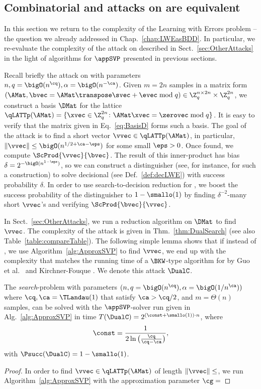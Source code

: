 \subsection{Combinatorial \DUAL and \BKW attacks on \LWE are equivalent} \label{subsec:ReEvalLWE}

In this section we return to the complexity of the Learning with Errors problem -- the question we already addressed in Chap.~\ref{chap:LWEasBDD}. In particular, we re-evaluate the complexity of the \DUAL attack on \LWE described in Sect.~\ref{sec:OtherAttacks} in the light of algorithms for $\appSVP$ presented in previous sections.

Recall briefly the \DUAL attack on \LWE with parameters $n, q = \bigO(n^{\cq}), \alpha = \bigO(n^{-\ca})$. Given $m=2n$ \LWE samples in a matrix form $(\AMat, \bvec = \AMat\transpose \svec + \evec \bmod q) \in \Z_q^{n \times 2n} \times \Z_q^{2n}$, we construct a basis $\DMat$ for the lattice $\qLATTp(\AMat)=\{ \xvec \in \Z_q^{2n} \colon \AMat \xvec = \zerovec \bmod q \}$. It is easy to verify that the matrix given in Eq.~\eqref{eq:BasisD} forms such a basis. The goal of the \DUAL attack is to find a short vector $\vvec \in \qLATTp(\AMat)$, in particular, $\|\vvec \| \leq \bigO(n^{1/2+\ca - \eps})$ for some small $\eps>0$. Once found, we compute $\ScProd{\vvec}{\bvec}$. The result of this inner-product has bias $\delta = 2^{-\bigO(n^{1-\eps})}$, so we can construct a distinguisher (see, for instance, \cite{EC:DucTraVau15} for such a construction) to solve decisional \LWE (see Def.~\ref{def:decLWE}) with success probability $\delta$. In order to use search-to-decision reduction for \LWE \cite{EC:MicPei12}, we boost the success probability of the distinguisher to $1-\smallo(1)$ by finding $\delta^{-2}$-many short $\vvec$'s and verifying $\ScProd{\bvec}{\vvec}$.

In Sect.~\ref{sec:OtherAttacks}, we run a \BKZ reduction algorithm on $\DMat$ to find $\vvec$. The complexity of the \DUAL attack is given in Thm.~\ref{thm:DualSearch} (see also Table~\ref{table:compareTable}). The following simple lemma shows that if instead of \BKW, we use Algorithm~\ref{alg:ApproxSVP} to find $\vvec$, we end up with the complexity that matches the running time of a $\BKW$-type algorithm for \LWE by Guo et al.\ \cite{C:GuoJohSta15} and Kirchner-Fouque \cite{C:KirFou15}. We denote this attack $\DualC$.

\begin{lemma}\label{lem:LWEDualComb1}
	The \emph{search}-\LWE problem with parameters $(n, q=\bigO(n^{\cq}), \alpha = \bigO(1 / n^{\ca}) )$ where $\cq, \ca = \TLandau(1)$ that satisfy $\ca>\cq/2$, and $m=\Theta(n)$ \LWE samples, can be solved with the $\appSVP$-solver run given in Alg.~\ref{alg:ApproxSVP} in time $T(\DualC) = 2^{(\const+\smallo(1))\cdot n} $, where
	\[
		 \const = \frac{1}{2 \ln \big( \tfrac{\cq}{\cq-\ca} \big) },
	\]
	with $\Psucc(\DualC) = 1- \smallo(1)$.
\end{lemma}

\begin{proof}
	In order to find $\vvec \in \qLATTp(\AMat)$ of length $\| \vvec \| \leq $, we run Algorithm~\ref{alg:ApproxSVP} with the approximation parameter $\cg = $ 
\end{proof}
